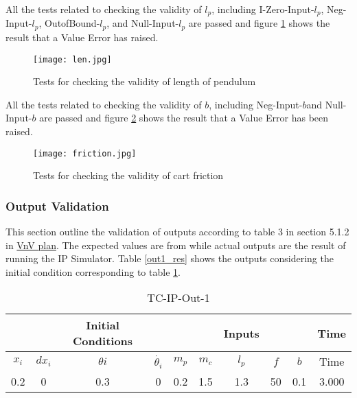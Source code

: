 \documentclass[12pt, titlepage]{article}
\begin{document}
 All the tests related to checking the validity of $l_p$, including I-Zero-Input-$l_p$, Neg-Input-$l_p$, OutofBound-$l_p$, and Null-Input-$l_p$ are passed and figure \ref{len} shows the result that a Value Error has raised.

  \begin{figure}[H]
\begin{center}
\texttt{[image: len.jpg]}
 \caption{Tests for checking the validity of length of pendulum}
 \label{len}
 \end{center}
 \end{figure}
  All the tests related to checking the validity of $b$, including Neg-Input-$b$and Null-Input-$b$ are passed and figure \ref{friction} shows the result that a Value Error has been raised.

  \begin{figure}[H]
\begin{center}
\texttt{[image: friction.jpg]}
 \caption{Tests for checking the validity of cart friction}
 \label{friction}
 \end{center}
 \end{figure}

\subsubsection{Output Validation}
This section outline the validation of outputs according to table 3 in section 5.1.2 in \href{https://github.com/MinMah23/CAS741-Project/tree/main/docs/VnVPlan}{VnV plan}. The expected values are from \cite{al-khazraji_2022} while actual outputs are the result of running the IP Simulator. Table \ref{out1_res} shows the outputs considering the initial condition corresponding to table \ref{out1}.

\begin{table}[ht]
\caption{TC-IP-Out-1} \label{out1}
\vspace*{2mm}
\centering
 \begin{tabular}{|c c c c|c c c c c|c|} 
 \hline
&&\textbf{Initial Conditions}& &  &  &  \textbf{Inputs} &  &&\textbf{Time}  \\ \hline
$x_i$&$dx_i$&$\theta{i}$&$\dot{\theta_{i}}$ & $m_p$ & $m_c$ & $l_p$ & $f$ & $b$  & Time \\ \hline
0.2&0&0.3&0& 0.2 & 1.5& 1.3& 50 & 0.1 & 3.000\\
 \hline
\end{tabular}
\end{table}	
\end{document}
